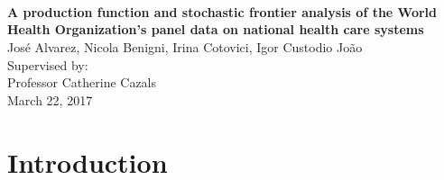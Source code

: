 \documentclass[12pt,a4paper]{article}\usepackage[]{graphicx}\usepackage[]{color}
\begin{document}



\vspace{1cm}
\begin{center}
 \\
\vspace{2cm}
 \\
\vspace{1cm}
 \\  %
\vspace{1cm}
\textbf{\Large{A production function and stochastic frontier analysis of the World Health Organization's panel data on national health care systems}} \\
\vspace{1cm}
Jos\'{e} Alvarez, Nicola Benigni, Irina Cotovici, Igor Custodio Jo\~{a}o \\
\vspace{1cm}
Supervised by: \\
Professor Catherine Cazals \\
\vspace{1cm}
March 22, 2017
\end{center}

\vfill


\newpage 
{}
\tableofcontents
\listoffigures

\newpage
\section{Introduction}
\end{document}
